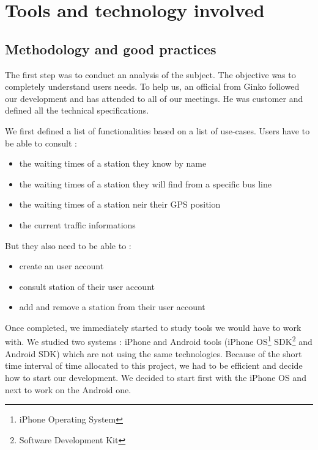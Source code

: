 \documentclass[a4paper, 12pt]{report}
\begin{document}


\chapter{Tools and technology involved}

\section{Methodology and good practices}


The first step was to conduct an analysis of the subject. The objective was to completely understand users needs. To help us, an official from Ginko followed our development and has attended to all of our meetings. He was customer and defined all the technical specifications.

We first defined a list of functionalities based on a list of use-cases. Users have to be able to consult :

\begin{itemize}
	\item the waiting times of a station they know by name
	\item the waiting times of a station they will find from a specific bus line
	\item the waiting times of a station neir their GPS position
	\item the current traffic informations
\end{itemize}

But they also need to be able to :

\begin{itemize}
	\item create an user account
	\item consult station of their user account
	\item add and remove a station from their user account
\end{itemize}

Once completed, we immediately started to study tools we would have to work with. We studied two systems : iPhone and Android tools (iPhone OS\footnote{iPhone Operating System} SDK\footnote{Software Development Kit} and Android SDK) which are not using the same technologies. Because of the short time interval of time allocated to this project, we had to be efficient and decide how to start our development. We decided to start first with the iPhone OS and next to work on the Android one. 
\end{document}
